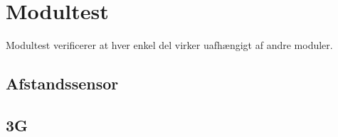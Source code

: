 \chapter{Modultest}
Modultest verificerer at hver enkel del virker uafhængigt af andre moduler. \\

\section{Afstandssensor}

\section{3G}



\newpage